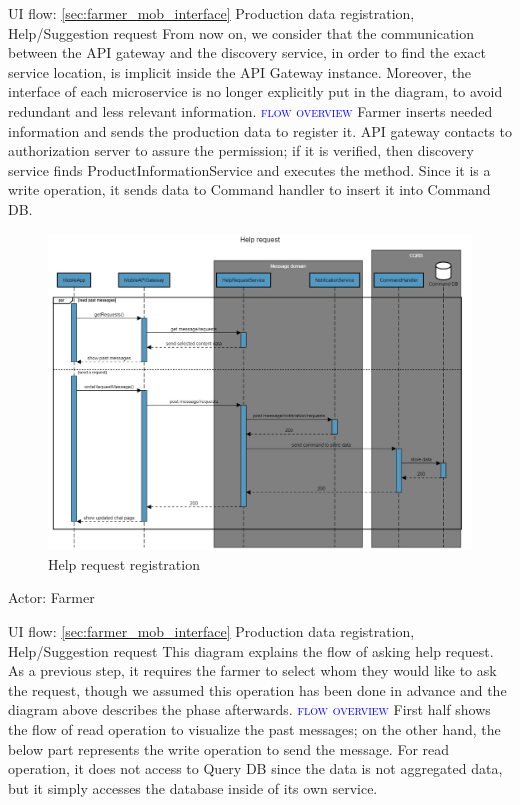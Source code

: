 UI flow: {\ref{sec:farmer_mob_interface} Production data registration, Help/Suggestion request}
\newline
\newline
From now on, we consider that the communication between the API gateway and the discovery service, in order to find the exact service location, is implicit inside the API Gateway instance. Moreover, the interface of each microservice is no longer explicitly put in the diagram, to avoid redundant and less relevant information.
\newline
\newline
\textsc{\textcolor{blue}{flow overview}}
\newline
Farmer inserts needed information and sends the production data to register it. API gateway contacts to authorization server to assure the permission; if it is verified, then discovery service finds ProductInformationService and executes the method. Since it is a write operation, it sends data to Command handler to insert it into Command DB.

\newpage
\begin{figure}[H]
	\centering
    \includegraphics[width=\textwidth]{Images/sequence-diagram/help-request.png}
	\caption{\label{fig:se_help}Help request registration}
\end{figure}
Actor: Farmer

UI flow: {\ref{sec:farmer_mob_interface} Production data registration, Help/Suggestion request}
\newline
\newline
This diagram explains the flow of asking help request.
As a previous step, it requires the farmer to select whom they would like to ask the request, though we assumed this operation has been done in advance and the diagram above describes the phase afterwards.
\newline
\newline
\textsc{\textcolor{blue}{flow overview}}
\newline
First half shows the flow of read operation to visualize the past messages; on the other hand, the below part represents the write operation to send the message. 
For read operation, it does not access to Query DB since the data is not aggregated data, but it simply accesses the database inside of its own service.

